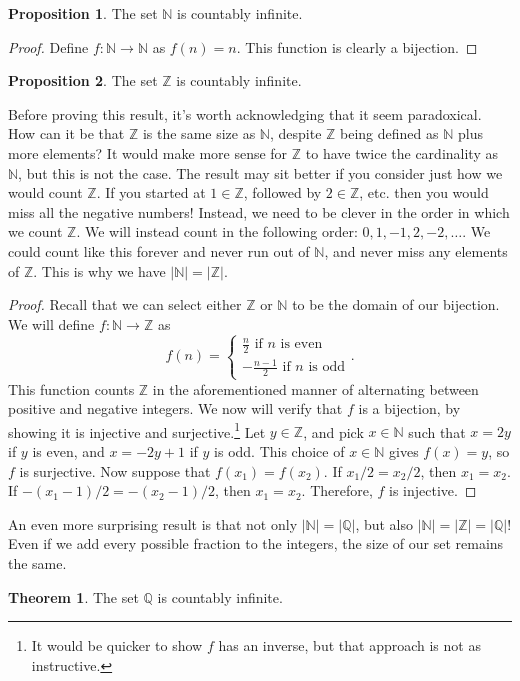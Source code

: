 \documentclass{article}
\newcommand{\N}{\mathbb{N}}
\newcommand{\Q}{\mathbb{Q}}
\newcommand{\Z}{\mathbb{Z}}
\theoremstyle{definition}
\newtheorem{proposition}{Proposition}[section]
\newtheorem{theorem}{Theorem}[section]
\begin{document}
\begin{proposition}
	The set $ \N $ is countably infinite.
\end{proposition}
\begin{proof}
	Define $ f:\N\to\N $ as $ f(n)=n $. This function is clearly a bijection. 
\end{proof}
\begin{proposition}
	The set $ \Z $ is countably infinite.
\end{proposition}
Before proving this result, it's worth acknowledging that it seem paradoxical. How can it be that $ \Z $ is the same size as $ \N $, despite $ \Z $ being defined as $ \N $ plus more elements? It would make more sense for $ \Z $ to have twice the cardinality as $ \N $, but this is not the case. The result may sit better if you consider just how we would count $ \Z $. If you started at $ 1\in\Z $, followed by $ 2\in\Z $, etc. then you would miss all the negative numbers! Instead, we need to be clever in the order in which we count $ \Z $. We will instead count in the following order: $ 0,1,-1,2,-2,\ldots $. We could count like this forever and never run out of $ \N $, and never miss any elements of $ \Z $. This is why we have $ |\N|=|\Z| $. 
\begin{proof}
Recall that we can select either $ \Z $ or $ \N $ to be the domain of our bijection. We will define $ f:\N\to\Z $ as
$$f(n)=\begin{cases}
\frac{n}{2}\text{ if }n\text{ is even}\\
-\frac{n-1}{2}\text{ if }n\text{ is odd}
\end{cases}.$$
This function counts $ \Z $ in the aforementioned manner of alternating between positive and negative integers. We now will verify that $ f $ is a bijection, by showing it is injective and surjective.\footnote{It would be quicker to show $ f $ has an inverse, but that approach is not as instructive.} Let $ y\in\Z $, and pick $ x\in\N $ such that $ x=2y $ if $ y $ is even, and $ x=-2y+1 $ if $ y $ is odd. This choice of $ x\in\N $ gives $ f(x)=y $, so $ f $ is surjective. Now suppose that $ f(x_1)=f(x_2) $. If $ x_1/2=x_2/2 $, then $ x_1=x_2 $. If $ -(x_1-1)/2=-(x_2-1)/2 $, then $ x_1=x_2 $. Therefore, $ f $ is injective.
\end{proof}
An even more surprising result is that not only $ |\N|=|\Q| $, but also $ |\N|=|\Z|=|\Q| $! Even if we add every possible fraction to the integers, the size of our set remains the same.
\begin{theorem}
	The set $ \Q $ is countably infinite. 
\end{theorem}
\end{document}
